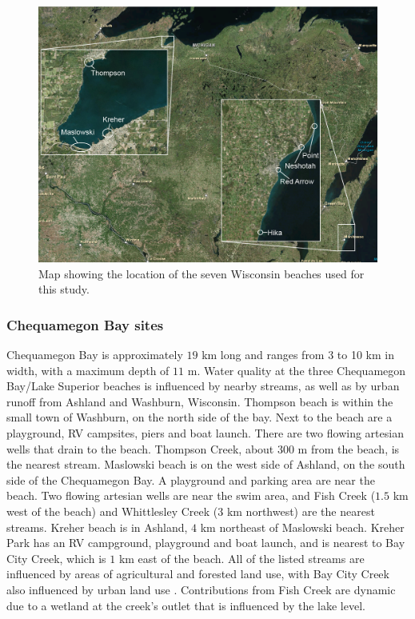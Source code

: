 \documentclass[authoryear,review, 12pt]{elsarticle}
\begin{document}
\begin{figure}
    \includegraphics[width=\textwidth]{../figures/sites.png}
    \caption{Map showing the location of the seven Wisconsin beaches used for this study.}
    \label{fig:sites}
\end{figure}

\subsubsection{Chequamegon Bay sites}\label{chequamegon-bay-sites}

Chequamegon Bay is approximately \(19\) km long and ranges from 3 to 10
km in width, with a maximum depth of \(11\) m. Water quality at the
three Chequamegon Bay/Lake Superior beaches is influenced by nearby
streams, as well as by urban runoff from Ashland and Washburn,
Wisconsin. Thompson beach is within the small town of Washburn, on the
north side of the bay. Next to the beach are a playground, RV campsites,
piers and boat launch. There are two flowing artesian wells that drain
to the beach. Thompson Creek, about \(300\) m from the beach, is the
nearest stream. Maslowski beach is on the west side of Ashland, on the
south side of the Chequamegon Bay. A playground and parking area are
near the beach. Two flowing artesian wells are near the swim area, and
Fish Creek (\(1.5\) km west of the beach) and Whittlesley Creek (\(3\)
km northwest) are the nearest streams. Kreher beach is in Ashland, \(4\)
km northeast of Maslowski beach. Kreher Park has an RV campground,
playground and boat launch, and is nearest to Bay City Creek, which is
\(1\) km east of the beach. All of the listed streams are influenced by
areas of agricultural and forested land use, with Bay City Creek also
influenced by urban land use \citep{Francy-et-al-2013}. Contributions
from Fish Creek are dynamic due to a wetland at the creek's outlet that
is influenced by the lake level.
\end{document}
